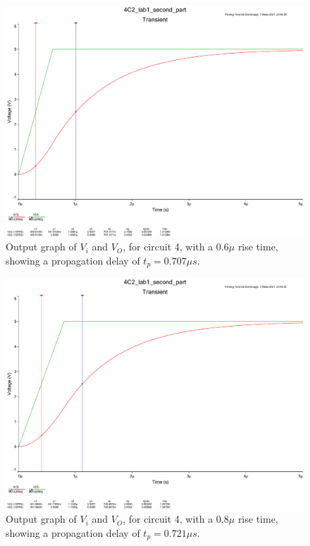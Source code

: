 \documentclass[11pt, a4paper]{article}
\begin{document}
\begin{figure}
  \centering
  \includegraphics[width=\textwidth]{report/img/question_4/rise_time_06u.pdf}
  \caption{\centering Output graph of $V_i$ and $V_O$, for circuit 4, with a $0.6\mu$ rise time, showing a propagation delay of $t_p = 0.707 \mu s$.}
    \label{fig:6rt}
\end{figure}

\begin{figure}
  \centering
  \includegraphics[width=\textwidth]{report/img/question_4/rise_time_08u.pdf}
  \caption{\centering Output graph of $V_i$ and $V_O$, for circuit 4, with a $0.8\mu$ rise time, showing a propagation delay of $t_p = 0.721 \mu s$.}
    \label{fig:8rt}
\end{figure}
\end{document}
